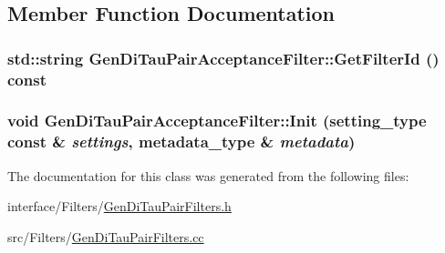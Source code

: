 \subsection{Member Function Documentation}
\hypertarget{classGenDiTauPairAcceptanceFilter_aa071d779af14ccf823fbcc3bdb4e9041}{
\subsubsection[{GetFilterId}]{\setlength{\rightskip}{0pt plus 5cm}std::string GenDiTauPairAcceptanceFilter::GetFilterId () const}}
\label{classGenDiTauPairAcceptanceFilter_aa071d779af14ccf823fbcc3bdb4e9041}
\hypertarget{classGenDiTauPairAcceptanceFilter_a2dcca8c74d6c4734695166a993f74da4}{
\subsubsection[{Init}]{\setlength{\rightskip}{0pt plus 5cm}void GenDiTauPairAcceptanceFilter::Init (setting\_\-type const \& {\em settings}, \/  metadata\_\-type \& {\em metadata})}}
\label{classGenDiTauPairAcceptanceFilter_a2dcca8c74d6c4734695166a993f74da4}


The documentation for this class was generated from the following files:\begin{DoxyCompactItemize}
\item 
interface/Filters/\hyperlink{GenDiTauPairFilters_8h}{GenDiTauPairFilters.h}\item 
src/Filters/\hyperlink{GenDiTauPairFilters_8cc}{GenDiTauPairFilters.cc}\end{DoxyCompactItemize}
